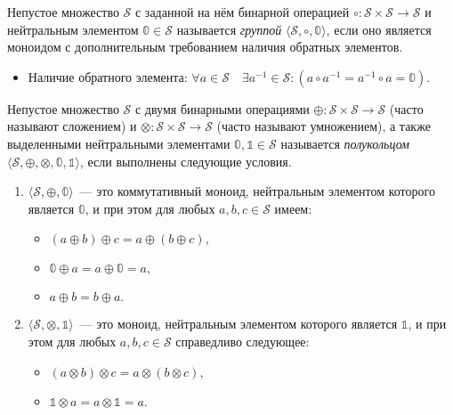 \begin{definition}[Группа]
Непустое множество $\mathcal{S}$ с заданной на нём бинарной операцией $\circ: {\mathcal{S}} \times {\mathcal{S}} \to {\mathcal{S}}$ и нейтральным элементом $\mathbb{0} \in \mathcal{S}$ называется \emph{группой} $\langle \mathcal{S} ,\circ, \mathbb{0} \rangle$, если оно является моноидом с дополнительным требованием наличия обратных элементов. 
\begin{itemize}
\item Наличие обратного элемента: $ \forall a\in \mathcal{S}\quad \exists a^{-1}\in \mathcal{S}\colon (a \circ a^{-1}=a^{-1} \circ a = \mathbb{0})$.
\end{itemize}
\end{definition}


\begin{definition}[Полукольцо]

Непустое множество $\mathcal{S}$ с двумя бинарными операциями $\oplus \colon \mathcal{S} \times \mathcal{S} \to \mathcal{S}$ (часто называют сложением) и $\otimes \colon \mathcal{S} \times \mathcal{S} \to \mathcal{S}$ (часто называют умножением), а также выделенными нейтральными элементами $\mathbb{0}, \mathbb{1} \in \mathcal{S}$ называется \emph{полукольцом} $\langle \mathcal{S}, \oplus, \otimes, \mathbb{0}, \mathbb{1} \rangle$, если выполнены следующие условия.
\begin{enumerate}

\item $\langle \mathcal{S}, \oplus, \mathbb{0} \rangle$~--- это коммутативный моноид, нейтральным элементом которого является $\mathbb{0}$, и при этом  для любых $a, b, c \in \mathcal{S}$ имеем:
\begin{itemize}
	\item $(a \oplus b) \oplus c = a \oplus (b \oplus c),$
	\item $\mathbb{0} \oplus a = a \oplus \mathbb{0} = a,$
	\item $a \oplus b = b \oplus a.$
\end{itemize}

\item $\langle \mathcal{S}, \otimes, \mathbb{1} \rangle$~--- это моноид, нейтральным элементом которого является  $\mathbb{1}$, и при этом для любых $a, b, c \in \mathcal{S}$ справедливо следующее:
\begin{itemize}
	\item $(a \otimes b) \otimes c = a \otimes (b \otimes c),$
    \item $\mathbb{1} \otimes a = a \otimes \mathbb{1} = a.$
\end{itemize}


\end{enumerate}
\end{definition}
